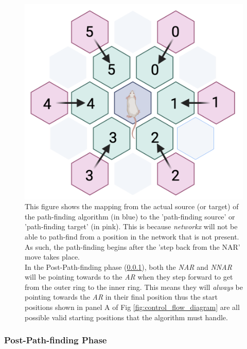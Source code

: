 \begin{figure}[h]
    \centering
    \includegraphics[scale=0.25]{images/move_to_inner_ring_2.png}
    \caption{This figure shows the mapping from the actual source (or target) of the path-finding algorithm (in blue) to the 'path-finding source' or 'path-finding target'  (in pink). This is because \textit{networkx} will not be able to path-find from a position in the network that is not present. As such, the path-finding begins after the 'step back from the NAR' move takes place.\\    In the Post-Path-finding phase (\ref{section:post_path_finding}), both the \textit{NAR} and \textit{NNAR} will be pointing towards to the \textit{AR} when they step forward to get from the outer ring to the inner ring. This means they will \textit{always} be pointing towards the \textit{AR} in their final position thus the start positions shown in panel A of Fig \ref{fig:control_flow_diagram} are all possible valid starting positions that the algorithm must handle.}
    \label{fig:pathfinding_source_target_mapping}
\end{figure}

\subsubsection{Post-Path-finding Phase}
\label{section:post_path_finding}


